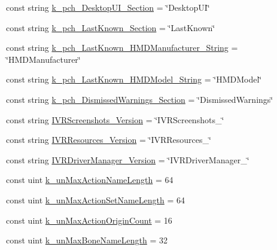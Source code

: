 \begin{DoxyCompactItemize}
\item 
const string \mbox{\hyperlink{class_valve_1_1_v_r_1_1_open_v_r_af15d79ff187a88b6b79ec755fbdd8ee1}{k\+\_\+pch\+\_\+\+Desktop\+U\+I\+\_\+\+Section}} = \char`\"{}Desktop\+UI\char`\"{}
\item 
const string \mbox{\hyperlink{class_valve_1_1_v_r_1_1_open_v_r_a3749144860ae9a563eff266a8c3012e3}{k\+\_\+pch\+\_\+\+Last\+Known\+\_\+\+Section}} = \char`\"{}Last\+Known\char`\"{}
\item 
const string \mbox{\hyperlink{class_valve_1_1_v_r_1_1_open_v_r_a699d53f228fcf269a3ada1690be006c6}{k\+\_\+pch\+\_\+\+Last\+Known\+\_\+\+H\+M\+D\+Manufacturer\+\_\+\+String}} = \char`\"{}H\+M\+D\+Manufacturer\char`\"{}
\item 
const string \mbox{\hyperlink{class_valve_1_1_v_r_1_1_open_v_r_a46aefb2ac734a64c02926ae7ad2ab5b5}{k\+\_\+pch\+\_\+\+Last\+Known\+\_\+\+H\+M\+D\+Model\+\_\+\+String}} = \char`\"{}H\+M\+D\+Model\char`\"{}
\item 
const string \mbox{\hyperlink{class_valve_1_1_v_r_1_1_open_v_r_ad61656f42142bfe3ca320f5687239010}{k\+\_\+pch\+\_\+\+Dismissed\+Warnings\+\_\+\+Section}} = \char`\"{}Dismissed\+Warnings\char`\"{}
\item 
const string \mbox{\hyperlink{class_valve_1_1_v_r_1_1_open_v_r_a228ae021caa6c10a637e11dda04391cd}{I\+V\+R\+Screenshots\+\_\+\+Version}} = \char`\"{}I\+V\+R\+Screenshots\+\_\char`\"{}
\item 
const string \mbox{\hyperlink{class_valve_1_1_v_r_1_1_open_v_r_ae5d5b56d5009bfa0ede43335c788d872}{I\+V\+R\+Resources\+\_\+\+Version}} = \char`\"{}I\+V\+R\+Resources\+\_\char`\"{}
\item 
const string \mbox{\hyperlink{class_valve_1_1_v_r_1_1_open_v_r_af3b515b214e93b6bff6bbbd764e48951}{I\+V\+R\+Driver\+Manager\+\_\+\+Version}} = \char`\"{}I\+V\+R\+Driver\+Manager\+\_\char`\"{}
\item 
const uint \mbox{\hyperlink{class_valve_1_1_v_r_1_1_open_v_r_ae56640716625cacf0f2f02b90987bf1e}{k\+\_\+un\+Max\+Action\+Name\+Length}} = 64
\item 
const uint \mbox{\hyperlink{class_valve_1_1_v_r_1_1_open_v_r_acc4816c732c54e3367bdba433fa321c4}{k\+\_\+un\+Max\+Action\+Set\+Name\+Length}} = 64
\item 
const uint \mbox{\hyperlink{class_valve_1_1_v_r_1_1_open_v_r_a5b9aa5b42d63f7949e30066b1abfe1b1}{k\+\_\+un\+Max\+Action\+Origin\+Count}} = 16
\item 
const uint \mbox{\hyperlink{class_valve_1_1_v_r_1_1_open_v_r_a19ec4e0ea22eb6c1850936bf2041c6d9}{k\+\_\+un\+Max\+Bone\+Name\+Length}} = 32

\end{DoxyCompactItemize}
